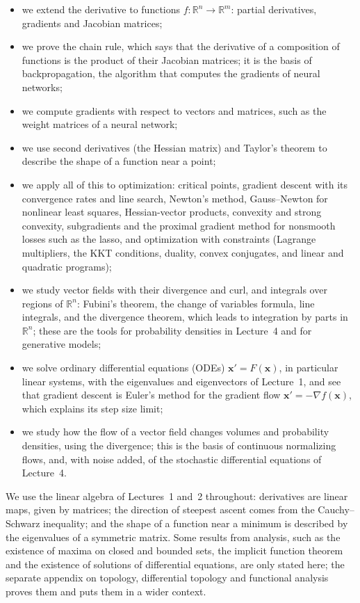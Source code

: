 \documentclass[11pt]{article}
\theoremstyle{definition}
\theoremstyle{plain}
\theoremstyle{remark}
\begin{document}
\begin{itemize}
    \item we extend the derivative to functions $f: \mathbb{R}^n \to \mathbb{R}^m$: partial derivatives, gradients and Jacobian matrices;
    \item we prove the chain rule, which says that the derivative of a composition of functions is the product of their Jacobian matrices; it is the basis of backpropagation, the algorithm that computes the gradients of neural networks;
    \item we compute gradients with respect to vectors and matrices, such as the weight matrices of a neural network;
    \item we use second derivatives (the Hessian matrix) and Taylor's theorem to describe the shape of a function near a point;
    \item we apply all of this to optimization: critical points, gradient descent with its convergence rates and line search, Newton's method, Gauss--Newton for nonlinear least squares, Hessian-vector products, convexity and strong convexity, subgradients and the proximal gradient method for nonsmooth losses such as the lasso, and optimization with constraints (Lagrange multipliers, the KKT conditions, duality, convex conjugates, and linear and quadratic programs);
    \item we study vector fields with their divergence and curl, and integrals over regions of $\mathbb{R}^n$: Fubini's theorem, the change of variables formula, line integrals, and the divergence theorem, which leads to integration by parts in $\mathbb{R}^n$; these are the tools for probability densities in Lecture~4 and for generative models;
    \item we solve ordinary differential equations (ODEs) $\mathbf{x}' = F(\mathbf{x})$, in particular linear systems, with the eigenvalues and eigenvectors of Lecture~1, and see that gradient descent is Euler's method for the gradient flow $\mathbf{x}' = -\nabla f(\mathbf{x})$, which explains its step size limit;
    \item we study how the flow of a vector field changes volumes and probability densities, using the divergence; this is the basis of continuous normalizing flows, and, with noise added, of the stochastic differential equations of Lecture~4.
\end{itemize}
We use the linear algebra of Lectures~1 and~2 throughout: derivatives are linear maps, given by matrices; the direction of steepest ascent comes from the Cauchy--Schwarz inequality; and the shape of a function near a minimum is described by the eigenvalues of a symmetric matrix. Some results from analysis, such as the existence of maxima on closed and bounded sets, the implicit function theorem and the existence of solutions of differential equations, are only stated here; the separate appendix on topology, differential topology and functional analysis proves them and puts them in a wider context.
\end{document}
